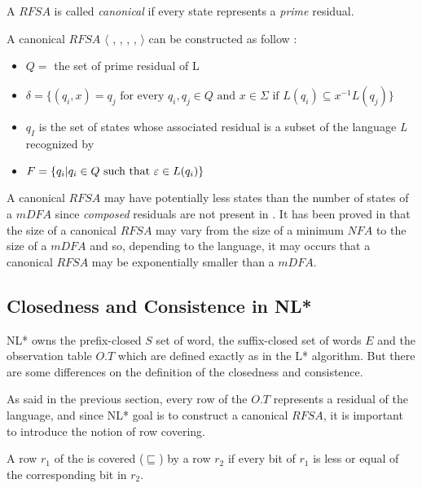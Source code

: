 \begin{definition}
  A $RFSA$ is called \textit{canonical} if every state represents a \textit{prime} residual.
\end{definition}

A canonical $RFSA$ $\langle$ \alphabet{}, \states{}, \transition{}, \qzero{}, \qend{} $\rangle$ can be constructed as follow :
\begin{itemize}
  \item $Q = $ the set of prime residual of L
  \item $\delta = \{(q_i, x) = q_j \text{ for every } q_i, q_j \in Q \text{ and } x \in \Sigma \text{ if } L(q_i) \subseteq x^{-1}L(q_j)\}$
  \item $q_I$ is the set of states whose associated residual is a subset of the language \textit{L} recognized by \automaton{}
  \item $F = \{q_i | q_i \in Q \text{ such that } \varepsilon \in L(q_i)\}$
\end{itemize}

A canonical $RFSA$ \automaton{} may have potentially less states than the number of states of a $mDFA$ since \textit{composed} residuals are not present in  \automaton{}. It has been proved in  \cite{RFSA} that the size of a canonical $RFSA$ may vary from the size of a minimum $NFA$ to the size of a $mDFA$ and so, depending to the language, it may occurs that a canonical $RFSA$ may be exponentially smaller than a $mDFA$.

\subsection{Closedness and Consistence in NL*}

NL* owns the prefix-closed $S$ set of word, the suffix-closed set of words $E$ and the observation table $O.T$ which are defined exactly as in the L* algorithm. But there are some differences on the definition of the closedness and consistence.

As said in the previous section, every row of the $O.T$ represents a residual of the language, and since NL* goal is to construct a canonical $RFSA$, it is important to introduce the notion of row covering.

\begin{definition}
  \label{def:row-covering}
  A row $r_1$ of the \OT is covered ($\sqsubseteq$) by a row $r_2$ if every bit of $r_1$ is less or equal of the corresponding bit in $r_2$.
\end{definition}

